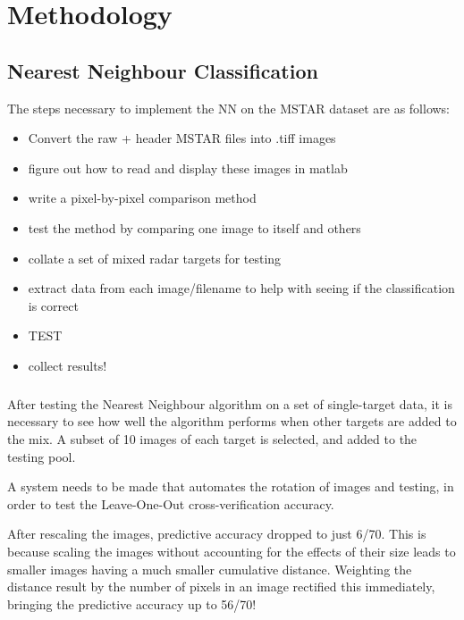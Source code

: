 \chapter{Methodology}
\section{Nearest Neighbour Classification}
The steps necessary to implement the NN on the MSTAR dataset are as follows:\\

\begin{itemize}
\item Convert the raw + header MSTAR files into .tiff images
\item figure out how to read and display these images in matlab
\item write a pixel-by-pixel comparison method
\item test the method by comparing one image to itself and others
\item collate a set of mixed radar targets for testing
\item extract data from each image/filename to help with seeing if the classification is correct
\item TEST
\item collect results!
\end{itemize}

\paragraph{}
After testing the Nearest Neighbour algorithm on a set of single-target data, it is necessary to see how well the algorithm performs when other targets are added to the mix. A subset of 10 images of each target is selected, and added to the testing pool.

A system needs to be made that automates the rotation of images and testing, in order to test the Leave-One-Out cross-verification accuracy.

After rescaling the images, predictive accuracy dropped to just 6/70. This is because scaling the images without accounting for the effects of their size leads to smaller images having a much smaller cumulative distance. Weighting the distance result by the number of pixels in an image rectified this immediately, bringing the predictive accuracy up to 56/70!
